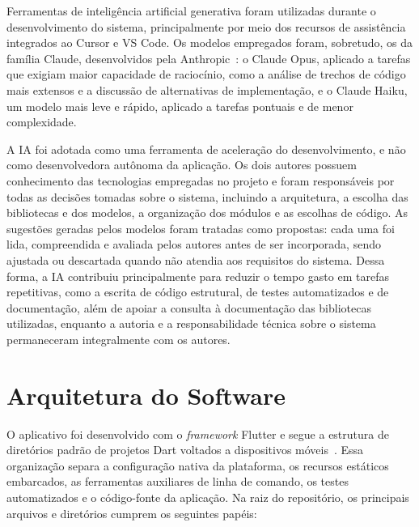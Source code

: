 Ferramentas de inteligência artificial generativa foram utilizadas durante o desenvolvimento do sistema, principalmente por meio dos recursos de assistência integrados ao Cursor e VS Code. Os modelos empregados foram, sobretudo, os da família Claude, desenvolvidos pela Anthropic~\cite{anthropic_claude}: o Claude Opus, aplicado a tarefas que exigiam maior capacidade de raciocínio, como a análise de trechos de código mais extensos e a discussão de alternativas de implementação, e o Claude Haiku, um modelo mais leve e rápido, aplicado a tarefas pontuais e de menor complexidade.

A \gls{IA} foi adotada como uma ferramenta de aceleração do desenvolvimento, e não como desenvolvedora autônoma da aplicação. Os dois autores possuem conhecimento das tecnologias empregadas no projeto e foram responsáveis por todas as decisões tomadas sobre o sistema, incluindo a arquitetura, a escolha das bibliotecas e dos modelos, a organização dos módulos e as escolhas de código. As sugestões geradas pelos modelos foram tratadas como propostas: cada uma foi lida, compreendida e avaliada pelos autores antes de ser incorporada, sendo ajustada ou descartada quando não atendia aos requisitos do sistema. Dessa forma, a \gls{IA} contribuiu principalmente para reduzir o tempo gasto em tarefas repetitivas, como a escrita de código estrutural, de testes automatizados e de documentação, além de apoiar a consulta à documentação das bibliotecas utilizadas, enquanto a autoria e a responsabilidade técnica sobre o sistema permaneceram integralmente com os autores.

\section{Arquitetura do Software} \label{sec:arquitetura}

O aplicativo foi desenvolvido com o \textit{framework} Flutter e segue a estrutura de diretórios padrão de projetos Dart voltados a dispositivos móveis~\cite{flutter_docs}. Essa organização separa a configuração nativa da plataforma, os recursos estáticos embarcados, as ferramentas auxiliares de linha de comando, os testes automatizados e o código-fonte da aplicação. Na raiz do repositório, os principais arquivos e diretórios cumprem os seguintes papéis:

